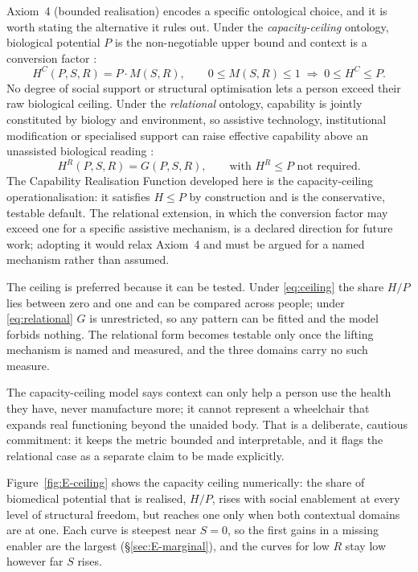 Axiom~4 (bounded realisation) encodes a specific ontological choice, and it is worth
stating the alternative it rules out. Under the \emph{capacity-ceiling} ontology,
biological potential $P$ is the non-negotiable upper bound and context is a
conversion factor \citep{venkatapuram_2011,who_2015_ageing}:
\begin{equation}
H^{C}(P,S,R)=P\cdot M(S,R),\qquad 0\le M(S,R)\le 1 \;\Rightarrow\; 0\le H^{C}\le P .
\label{eq:ceiling}
\end{equation}
No degree of social support or structural optimisation lets a person exceed their
raw biological ceiling. Under the \emph{relational} ontology, capability is jointly
constituted by biology and environment, so assistive technology, institutional
modification or specialised support can raise effective capability above an
unassisted biological reading \citep{venkatapuram_2011,who_2015_ageing}:
\begin{equation}
H^{R}(P,S,R)=G(P,S,R),\qquad \text{with } H^{R}\le P \text{ not required.}
\label{eq:relational}
\end{equation}
The Capability Realisation Function developed here is the capacity-ceiling
operationalisation: it satisfies $H\le P$ by construction and is the conservative,
testable default. The relational extension, in which the conversion factor may exceed
one for a specific assistive mechanism, is a declared direction for future work;
adopting it would relax Axiom~4 and must be argued for a named mechanism rather than
assumed.

The ceiling is preferred because it can be tested. Under \eqref{eq:ceiling}
the share $H/P$ lies between zero and one and can be compared across people;
under \eqref{eq:relational} $G$ is unrestricted, so any pattern can be fitted
and the model forbids nothing. The relational form becomes testable only once
the lifting mechanism is named and measured, and the three domains carry no
such measure.
\begin{reading}
The capacity-ceiling model says context can only help a person use the health they
have, never manufacture more; it cannot represent a wheelchair that expands real
functioning beyond the unaided body. That is a deliberate, cautious commitment: it
keeps the metric bounded and interpretable, and it flags the relational case as a
separate claim to be made explicitly.
\end{reading}

Figure~\ref{fig:E-ceiling} shows the capacity ceiling numerically: the share of biomedical potential that is realised, $H/P$, rises with social enablement at every level of structural freedom, but reaches one only when both contextual domains are at one.
Each curve is steepest near $S=0$, so the first gains in a missing enabler are
the largest (\S\ref{sec:E-marginal}), and the curves for low $R$ stay low
however far $S$ rises.

